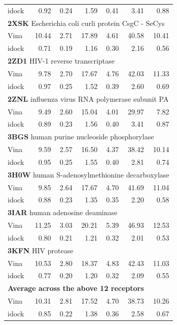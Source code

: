\begin{table}
\begin{tabular}{lrrrrrr}
idock &  0.92 &  0.24 &  1.59 &  0.41 &  3.41 &  0.88\\
\multicolumn{7}{l}{\textbf{2XSK} Escherichia coli curli protein CsgC - SeCys}\\
Vina  & 10.44 &  2.71 & 17.89 &  4.61 & 40.58 & 10.41\\
idock &  0.71 &  0.19 &  1.16 &  0.30 &  2.16 &  0.56\\
\multicolumn{7}{l}{\textbf{2ZD1} HIV-1 reverse transcriptase}\\
Vina  &  9.78 &  2.70 & 17.67 &  4.76 & 42.03 & 11.33\\
idock &  0.97 &  0.25 &  1.52 &  0.39 &  2.60 &  0.69\\
\multicolumn{7}{l}{\textbf{2ZNL} influenza virus RNA polymerase subunit PA}\\
Vina  &  9.49 &  2.60 & 15.04 &  4.01 & 29.97 &  7.82\\
idock &  0.89 &  0.23 &  1.56 &  0.40 &  3.41 &  0.87\\
\multicolumn{7}{l}{\textbf{3BGS} human purine nucleoside phosphorylase}\\
Vina  &  9.59 &  2.57 & 16.50 &  4.37 & 38.42 & 10.14\\
idock &  0.95 &  0.25 &  1.55 &  0.40 &  2.81 &  0.74\\
\multicolumn{7}{l}{\textbf{3H0W} human S-adenosylmethionine decarboxylase}\\
Vina  &  9.85 &  2.64 & 17.67 &  4.70 & 41.69 & 11.04\\
idock &  0.88 &  0.23 &  1.35 &  0.35 &  2.20 &  0.58\\
\multicolumn{7}{l}{\textbf{3IAR} human adenosine deaminase}\\
Vina  & 11.25 &  3.03 & 20.21 &  5.39 & 46.93 & 12.53\\
idock &  0.80 &  0.21 &  1.21 &  0.32 &  2.01 &  0.53\\
\multicolumn{7}{l}{\textbf{3KFN} HIV protease}\\
Vina  & 10.53 &  2.80 & 18.37 &  4.83 & 42.43 & 11.03\\
idock &  0.77 &  0.20 &  1.20 &  0.32 &  2.09 &  0.55\\
\multicolumn{7}{l}{\textbf{Average across the above 12 receptors}}\\
Vina  & 10.31 &  2.81 & 17.52 &  4.70 & 38.73 & 10.26\\
idock &  0.85 &  0.22 &  1.38 &  0.36 &  2.58 &  0.67\\
\hline
\end{tabular}
\end{table}

